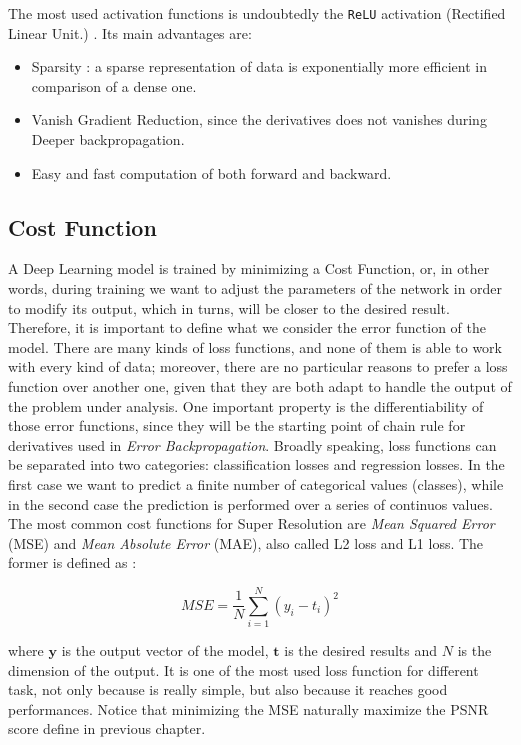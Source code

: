\documentclass[12pt,a4paper]{report}
\begin{document}
The most used activation functions is undoubtedly the {\tt ReLU} activation (Rectified Linear Unit.) \cite{Relu}. Its main advantages are:

\begin{itemize}
 \setlength\itemsep{-0.2em}
 \item Sparsity : a sparse representation of data is exponentially more efficient in comparison of a dense one.
 \item Vanish Gradient Reduction, since the derivatives does not vanishes during Deeper backpropagation.
 \item Easy and fast computation of both forward and backward.
\end{itemize}

\subsection*{Cost Function}

A Deep Learning model is trained by minimizing a Cost Function, or, in other words, during training we want to adjust the parameters of the network in order to modify its output, which in turns, will be closer to the desired result. 
Therefore, it is important to define what we consider the error function of the model.
There are many kinds of loss functions, and none of them is able to work with every kind of data; moreover, there are no particular reasons to prefer a loss function over another one, given that they are both adapt to handle the output of the problem under analysis. 
One important property is the differentiability of those error functions, since they will be the starting point of chain rule for derivatives used in {\it Error Backpropagation}.
Broadly speaking, loss functions can be separated into two categories: classification losses and regression losses. In the first case we want to predict a finite number of categorical values (classes), while in the second case the prediction is performed over a series of continuos values.
The most common cost functions for Super Resolution are {\it Mean Squared Error} (MSE) and {\it Mean Absolute Error} (MAE), also called L2 loss and L1 loss. 
The former is defined as : 

\begin{equation}
 MSE = \frac{1}{N} \sum_{i=1}^{N} (y_i - t_i)^2
\end{equation}

where $\bm{y}$ is the output vector of the model, $\bm{t}$ is the desired results and $N$ is the dimension of the output.
It is one of the most used loss function for different task, not only because is really simple, but also because it reaches good performances.
Notice that minimizing the MSE naturally maximize the PSNR score define in previous chapter.
\end{document}
